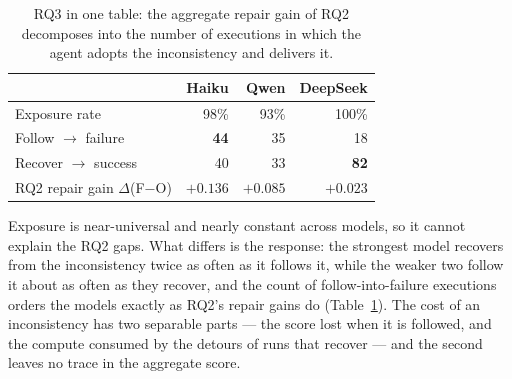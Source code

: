 \begin{table}[t]
\centering\small
\caption{RQ3 in one table: the aggregate repair gain of RQ2 decomposes into the number of executions
in which the agent adopts the inconsistency and delivers it.}
\label{tab:rq3-summary}
\begin{tabular}{@{}lrrr@{}}
\toprule
 & Haiku & Qwen & DeepSeek \\
\midrule
Exposure rate                    & 98\% & 93\% & 100\% \\
Follow $\rightarrow$ failure     & \textbf{44} & 35 & 18 \\
Recover $\rightarrow$ success    & 40 & 33 & \textbf{82} \\
RQ2 repair gain $\Delta$(F$-$O)  & $+0.136$ & $+0.085$ & $+0.023$ \\
\bottomrule
\end{tabular}
\end{table}

Exposure is near-universal and nearly constant across models, so it cannot explain the RQ2 gaps. What
differs is the response: the strongest model recovers from the inconsistency twice as often as it
follows it, while the weaker two follow it about as often as they recover, and the count of
follow-into-failure executions orders the models exactly as RQ2's repair gains do
(Table~\ref{tab:rq3-summary}). The cost of an inconsistency has two separable parts --- the score lost
when it is followed, and the compute consumed by the detours of runs that recover --- and the second
leaves no trace in the aggregate score.
